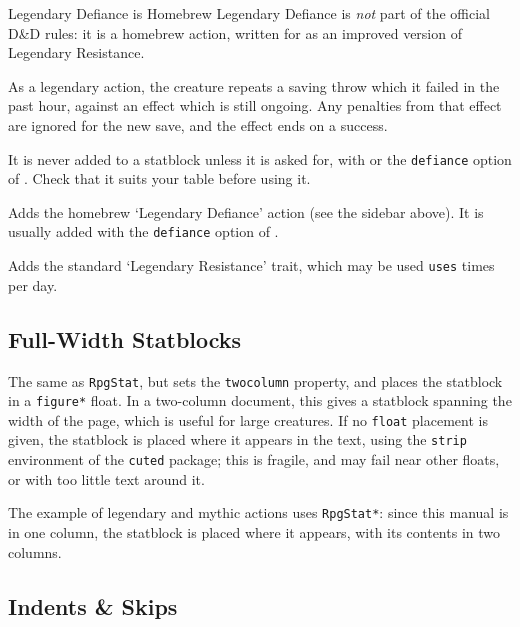 			{
				\begin{RpgSidebar}{Legendary Defiance is Homebrew}
					Legendary Defiance is \textit{not} part of the official D\&D rules: it is a homebrew action, written for \rpgtex{} as an improved version of Legendary Resistance.

					As a legendary action, the creature repeats a saving throw which it failed in the past hour, against an effect which is still ongoing. Any penalties from that effect are ignored for the new save, and the effect ends on a success.

					It is never added to a statblock unless it is asked for, with  or the \texttt{defiance} option of . Check that it suits your table before using it.
				\end{RpgSidebar}
				Adds the homebrew `Legendary Defiance' action (see the sidebar above). It is usually added with the \texttt{defiance} option of .
			}
			{
				Adds the standard `Legendary Resistance' trait, which may be used \texttt{uses} times per day.
			}



	\subsection{Full-Width Statblocks}

		{
			The same as \texttt{RpgStat}, but sets the \texttt{twocolumn} property, and places the statblock in a \texttt{figure*} float. In a two-column document, this gives a statblock spanning the width of the page, which is useful for large creatures. If no \texttt{float} placement is given, the statblock is placed where it appears in the text, using the \texttt{strip} environment of the \texttt{cuted} package; this is fragile, and may fail near other floats, or with too little text around it.
		}

		The example of legendary and mythic actions  uses \texttt{RpgStat*}: since this manual is in one column, the statblock is placed where it appears, with its contents in two columns.

	\subsection{Indents \& Skips}

